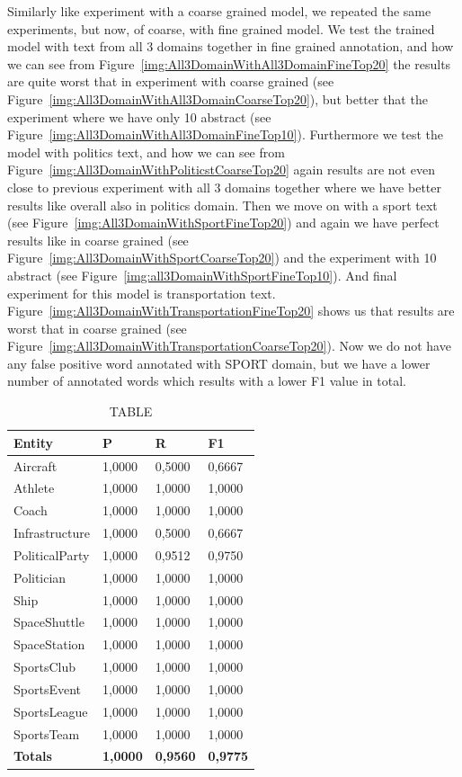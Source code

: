 \documentclass[thesis=M,english]{FITthesis}[2018/05/30]
\begin{document}
	Similarly like experiment with a coarse grained model, we repeated the same experiments, but now, of coarse, with fine grained model.
	We test the trained model with text from all 3 domains together in fine grained annotation, and how we can see from Figure~\ref{img:All3DomainWithAll3DomainFineTop20} the results are quite worst that in experiment with coarse grained (see Figure~\ref{img:All3DomainWithAll3DomainCoarseTop20}), but better that the experiment where we have only 10 abstract (see Figure~\ref{img:All3DomainWithAll3DomainFineTop10}).
	Furthermore we test the model with politics text, and how we can see from Figure~\ref{img:All3DomainWithPoliticstCoarseTop20} again results are not even close to previous experiment with all 3 domains together where we have better results like overall also in politics domain.
	Then we move on with a sport text (see Figure~\ref{img:All3DomainWithSportFineTop20}) and again we have perfect results like in coarse grained (see Figure~\ref{img:All3DomainWithSportCoarseTop20}) and the experiment with 10 abstract (see Figure~\ref{img:all3DomainWithSportFineTop10}).
	And final experiment for this model is transportation text. Figure~\ref{img:All3DomainWithTransportationFineTop20} shows us that results are worst that in coarse grained (see Figure~\ref{img:All3DomainWithTransportationCoarseTop20}). Now we do not have any false positive word annotated with SPORT domain, but we have a lower number of annotated words which results with a lower F1 value in total.	 
	\begin{table}[H]\centering
		\caption{TABLE}
		\label{}
		\begin{tabular}{|l|l|l|l|}
			\hline {\textbf{Entity}} & {\textbf{P}} & {\textbf{R}} & {\textbf{F1}}\\\hline
				Aircraft & 1,0000 & 0,5000 & 0,6667\\
				Athlete & 1,0000 & 1,0000 & 1,0000\\
				Coach & 1,0000 & 1,0000 & 1,0000\\
				Infrastructure & 1,0000 & 0,5000 & 0,6667\\
				PoliticalParty & 1,0000 & 0,9512 & 0,9750\\
				Politician & 1,0000 & 1,0000 & 1,0000\\
				Ship & 1,0000 & 1,0000 & 1,0000\\
				SpaceShuttle & 1,0000 & 1,0000 & 1,0000\\
				SpaceStation & 1,0000 & 1,0000 & 1,0000\\ 
				SportsClub & 1,0000 & 1,0000 & 1,0000\\
				SportsEvent & 1,0000 & 1,0000 & 1,0000\\
				SportsLeague & 1,0000 & 1,0000 & 1,0000\\
				SportsTeam & 1,0000 & 1,0000 & 1,0000\\\hline
				\textbf{Totals} & \textbf{1,0000} & \textbf{0,9560} & \textbf{0,9775}\\\hline
		\end{tabular}
	\end{table}
\end{document}
